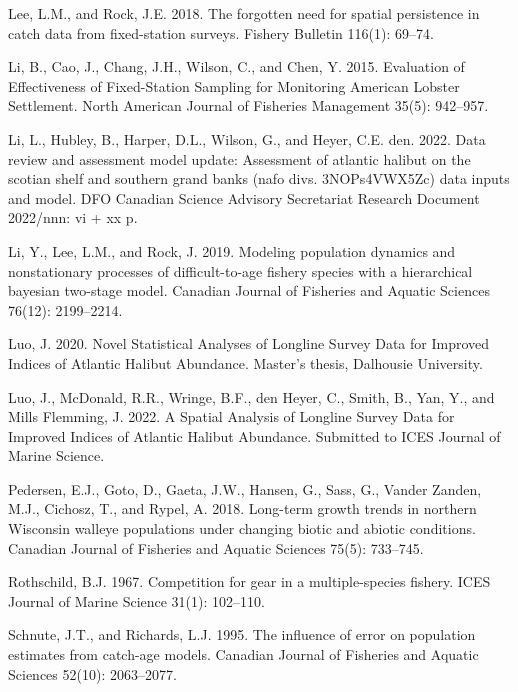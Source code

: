 \documentclass[12pt]{article}\usepackage[]{graphicx}\usepackage[]{color}
\begin{document}
\leavevmode\hypertarget{ref-Lee2018}{}%
Lee, L.M., and Rock, J.E. 2018. The forgotten need for spatial persistence in catch data from fixed-station surveys. Fishery Bulletin 116(1): 69--74.

\leavevmode\hypertarget{ref-Li2015}{}%
Li, B., Cao, J., Chang, J.H., Wilson, C., and Chen, Y. 2015. Evaluation of Effectiveness of Fixed-Station Sampling for Monitoring American Lobster Settlement. North American Journal of Fisheries Management 35(5): 942--957.

\leavevmode\hypertarget{ref-Li2022}{}%
Li, L., Hubley, B., Harper, D.L., Wilson, G., and Heyer, C.E. den. 2022. Data review and assessment model update: Assessment of atlantic halibut on the scotian shelf and southern grand banks (nafo divs. 3NOPs4VWX5Zc) data inputs and model. DFO Canadian Science Advisory Secretariat Research Document 2022/nnn: vi + xx p.

\leavevmode\hypertarget{ref-Li2019}{}%
Li, Y., Lee, L.M., and Rock, J. 2019. Modeling population dynamics and nonstationary processes of difficult-to-age fishery species with a hierarchical bayesian two-stage model. Canadian Journal of Fisheries and Aquatic Sciences 76(12): 2199--2214.

\leavevmode\hypertarget{ref-Luo2020}{}%
Luo, J. 2020. Novel Statistical Analyses of Longline Survey Data for Improved Indices of Atlantic Halibut Abundance. Master's thesis, Dalhousie University.

\leavevmode\hypertarget{ref-Luo2022}{}%
Luo, J., McDonald, R.R., Wringe, B.F., den Heyer, C., Smith, B., Yan, Y., and Mills Flemming, J. 2022. A Spatial Analysis of Longline Survey Data for Improved Indices of Atlantic Halibut Abundance. Submitted to ICES Journal of Marine Science.

\leavevmode\hypertarget{ref-Pedersen2018}{}%
Pedersen, E.J., Goto, D., Gaeta, J.W., Hansen, G., Sass, G., Vander Zanden, M.J., Cichosz, T., and Rypel, A. 2018. Long-term growth trends in northern Wisconsin walleye populations under changing biotic and abiotic conditions. Canadian Journal of Fisheries and Aquatic Sciences 75(5): 733--745.

\leavevmode\hypertarget{ref-Rothschild1967}{}%
Rothschild, B.J. 1967. Competition for gear in a multiple-species fishery. ICES Journal of Marine Science 31(1): 102--110.

\leavevmode\hypertarget{ref-Schnute1995}{}%
Schnute, J.T., and Richards, L.J. 1995. The influence of error on population estimates from catch-age models. Canadian Journal of Fisheries and Aquatic Sciences 52(10): 2063--2077.
\end{document}
